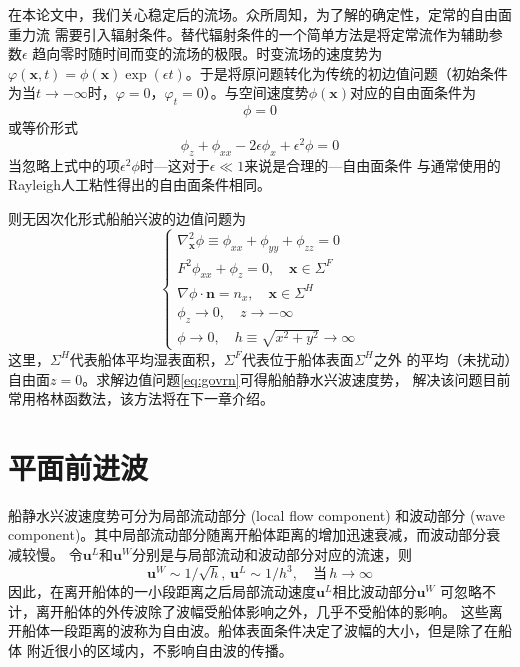 在本论文中，我们关心稳定后的流场。众所周知，为了解的确定性，定常的自由面重力流
需要引入辐射条件。替代辐射条件的一个简单方法是将定常流作为辅助参数$\epsilon$
趋向零时随时间而变的流场的极限。时变流场的速度势为$\varphi(\mathbf{x},t)=\phi(\mathbf{x})\exp(\epsilon t)$。于是将原问题转化为传统的初边值问题（初始条件为当$t\to-\infty$时，$\varphi=0$，$\varphi_t=0$）。与空间速度势$\phi(\mathbf{x})$对应的自由面条件为
\begin{equation*}
  [\partial_z+(\partial_x-\epsilon)^2]\phi=0
\end{equation*}
或等价形式
\begin{equation*}
  \phi_z+\phi_{xx}-2\epsilon\phi_x+\epsilon^2\phi=0
\end{equation*}
当忽略上式中的项$\epsilon^2\phi$时---这对于$\epsilon\ll1$来说是合理的---自由面条件
与通常使用的Rayleigh人工粘性得出的自由面条件相同。

则无因次化形式船舶兴波的边值问题为
\begin{equation}\label{eq:govrn}
\left\{ 
  \begin{array}{l}
  \nabla^2_{\mathbf{x}}\phi\equiv\phi_{xx}+\phi_{yy}+\phi_{zz}=0 \\
  F^2\phi_{xx}+\phi_z=0,\quad\mathbf{x}\in\Sigma^F\\
  \nabla\phi\cdot\mathbf{n}=n_x, \quad \mathbf{x}\in\Sigma^H\\
  \phi_z\rightarrow0, \quad z\rightarrow -\infty\\
  \phi\rightarrow0, \quad h\equiv\sqrt{x^2+y^2}\rightarrow\infty
\end{array} \right.
\end{equation}
这里，$\Sigma^H$代表船体平均湿表面积，$\Sigma^F$代表位于船体表面$\Sigma^H$之外
的平均（未扰动）自由面$z=0$。求解边值问题\eqref{eq:govrn}可得船舶静水兴波速度势，
解决该问题目前常用格林函数法，该方法将在下一章介绍。

\section{平面前进波}
\label{sec:freewav}

船静水兴波速度势可分为局部流动部分 (local flow component) 和波动部分 (wave 
component)。其中局部流动部分随离开船体距离的增加迅速衰减，而波动部分衰减较慢。
令$\mathbf{u}^L$和$\mathbf{u}^W$分别是与局部流动和波动部分对应的流速，则
\begin{equation}
\mathbf{u}^W\sim 1/\sqrt{h},\,\mathbf{u}^L\sim 1/h^3, \quad\text{当}\,h\rightarrow\infty
  \label{eq:uWuL}
\end{equation}
因此，在离开船体的一小段距离之后局部流动速度$\mathbf{u}^L$相比波动部分$\mathbf{u}^W$
可忽略不计，离开船体的外传波除了波幅受船体影响之外，几乎不受船体的影响。
这些离开船体一段距离的波称为自由波。船体表面条件决定了波幅的大小，但是除了在船体
附近很小的区域内，不影响自由波的传播。

